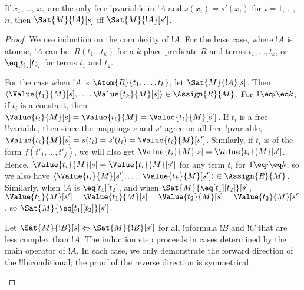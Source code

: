 \documentclass[../../include/open-logic-section]{subfiles}
\begin{document}
\begin{prop}
If $x_1$, \dots, $x_n$ are the only free !p{variable} in $!A$ and $s(x_i)
= s'(x_i)$ for $i = 1$, \dots, $n$, then $\Sat{M}{!A}[s]$ iff
$\Sat{M}{!A}[s']$.
\end{prop}

\begin{proof}
We use induction on the complexity of $!A$. For the base case, where
$!A$ is atomic, $!A$ can be: 
$R(t_1 \ldots t_k)$ for a $k$-place predicate $R$ and terms
$t_1,\ldots,t_k$, or $\eq[t_1][t_2]$ for terms $t_1$ and $t_2$.


For the case when $!A$ is $\Atom{R}{t_1, \ldots, t_k}$, let
$\Sat{M}{!A}[s]$. Then $\langle \Value{t_1}{M}[s], \ldots,
\Value{t_k}{M}[s] \rangle \in \Assign{R}{M}$. For $1 \eq i \eq k$,
if $t_i$ is a constant, then $\Value{t_i}{M}[s] = \Value{t_i}{M} =
\Value{t_i}{M}[s']$. If $t_i$ is a free !!{variable}, then since the
mappings $s$ and $s'$ agree on all free !p{variable}, $\Value{t_i}{M}[s]
= s(t_i) = s'(t_i) = \Value{t_i}{M}[s']$. Similarly, if $t_i$ is of
the form $f(t'_1,\ldots,t'_j)$, we will also get $\Value{t_i}{M}[s] =
\Value{t_i}{M}[s']$. Hence, $\Value{t_i}{M}[s] = \Value{t_i}{M}[s']$
for any term $t_i$ for $1 \eq i \eq k$, so we also have $\langle
\Value{t_i}{M}[s'], \ldots, \Value{t_k}{M}[s'] \rangle \in
\Assign{R}{M}$. Similarly, when $!A$ is $\eq[t_1][t_2]$, and when
$\Sat{M}{\eq[t_1][t_2]}[s]$, $\Value{t_1}{M}[s'] = \Value{t_1}{M}[s] =
\Value{t_2}{M}[s] = \Value{t_2}{M}[s']$, so $\Sat{M}{\eq[t_1][t_2]}[s']$.

Let $\Sat{M}{!B}[s] \Leftrightarrow \Sat{M}{!B}[s']$ for all
!p{formula} $!B$ and $!C$ that are less complex than $!A$. The
induction step proceeds in cases determined by the main operator of
$!A$. In each case, we only demonstrate the forward direction of the
!!{biconditional}; the proof of the reverse direction is symmetrical.

\begin{enumerate}


\end{enumerate}
\end{proof}
\end{document}
